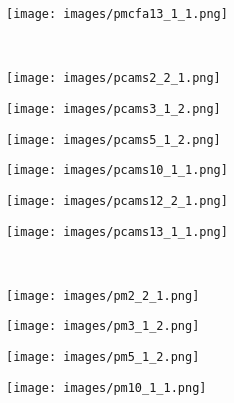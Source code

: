 \documentclass[journal]{IEEEtran}
\begin{document}
\begin{figure*}
\begin{subfigure}[b]{0.16\textwidth}
    \end{subfigure}
    \hfill
    \begin{subfigure}[b]{0.16\textwidth}
        \texttt{[image: images/pmcfa13\_1\_1.png]}
    \end{subfigure}
    \\
    \vspace{1mm}
    \begin{subfigure}[b]{0.16\textwidth}
        \texttt{[image: images/pcams2\_2\_1.png]}
    \end{subfigure}
    \hfill
    \begin{subfigure}[b]{0.16\textwidth}
        \texttt{[image: images/pcams3\_1\_2.png]}
    \end{subfigure}
    \hfill
    \begin{subfigure}[b]{0.16\textwidth}
        \texttt{[image: images/pcams5\_1\_2.png]}
    \end{subfigure}
    \hfill
    \begin{subfigure}[b]{0.16\textwidth}
        \texttt{[image: images/pcams10\_1\_1.png]}
    \end{subfigure}
    \hfill
    \begin{subfigure}[b]{0.16\textwidth}
        \texttt{[image: images/pcams12\_2\_1.png]}
    \end{subfigure}
    \hfill
    \begin{subfigure}[b]{0.16\textwidth}
        \texttt{[image: images/pcams13\_1\_1.png]}
    \end{subfigure}
    \\
    \vspace{1mm}
    \begin{subfigure}[b]{0.16\textwidth}
        \texttt{[image: images/pm2\_2\_1.png]}
    \end{subfigure}
    \hfill
    \begin{subfigure}[b]{0.16\textwidth}
        \texttt{[image: images/pm3\_1\_2.png]}
    \end{subfigure}
    \hfill
    \begin{subfigure}[b]{0.16\textwidth}
        \texttt{[image: images/pm5\_1\_2.png]}
    \end{subfigure}
    \hfill
    \begin{subfigure}[b]{0.16\textwidth}
        \texttt{[image: images/pm10\_1\_1.png]}
    \end{subfigure}

\end{figure*}
\end{document}
